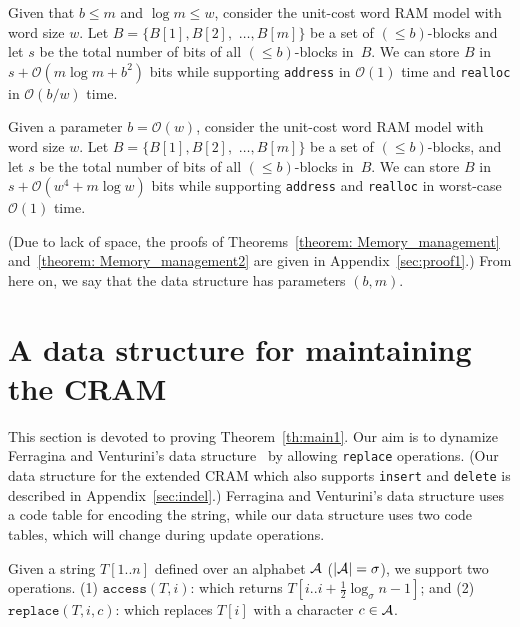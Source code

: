 \documentclass{llncs}
\newcommand{\Order}{\mathcal{O}}
\begin{document}
\begin{theorem}
\label{theorem: Memory_management}
Given that $b \le m$ and $\log m \le w$,
consider the unit-cost word RAM model with word size $w$.
Let $B = \{B[1], B[2],$ $ \dots, B[m]\}$ be a set of $(\leq b)$-blocks
and let $s$ be the total number of bits of all $(\leq b)$-blocks in~$B$.
We can store $B$ in $s + \Order(m \log m + b^2)$ bits while supporting
\textnormal{\texttt{address}} in $\Order(1)$ time and
\textnormal{\texttt{realloc}} in $\Order(b/w)$ time.
\end{theorem}

\begin{theorem}
\label{theorem: Memory_management2}
Given a parameter $b = \Order(w)$,
consider the unit-cost word RAM model with word size $w$.
Let $B = \{B[1], B[2],$ $ \dots, B[m]\}$ be a set of $(\leq b)$-blocks,
and let
$s$ be the total number of bits of all $(\leq b)$-blocks in~$B$.
We can store $B$ in $s + \Order(w^4 + m \log w)$ bits while supporting
\textnormal{\texttt{address}} and \textnormal{\texttt{realloc}}
in worst-case $\Order(1)$ time.
\end{theorem}

\noindent
(Due to lack of space, the proofs of
Theorems~\ref{theorem: Memory_management}
and~\ref{theorem: Memory_management2}
are given in Appendix~\ref{sec:proof1}.)
From here on, we say that the data structure has parameters $(b, m)$.




\section{A data structure for maintaining the CRAM}
\label{sec:replace}

This section is devoted to proving Theorem~\ref{th:main1}.
Our aim is to dynamize Ferragina and Venturini's
data structure~\cite{FerVen07b} by allowing \texttt{replace} operations.
(Our data structure for the extended CRAM which also supports
\texttt{insert} and \texttt{delete} is described in Appendix~\ref{sec:indel}.)
Ferragina and Venturini's data structure uses a code table for encoding
the string, while our data structure uses two code tables, which will
change during update operations.

Given a string $T[1..n]$ defined over an alphabet ${\cal A}$ ($| {\cal A} | = \sigma$),
we support two operations. 
(1) $\texttt{access}(T,i)$: which returns $T[i..i+\frac{1}{2}\log_{\sigma} n-1]$; and 
(2) $\texttt{replace}(T, i, c)$: which replaces $T[i]$ with a character $c \in {\cal A}$.
\end{document}
